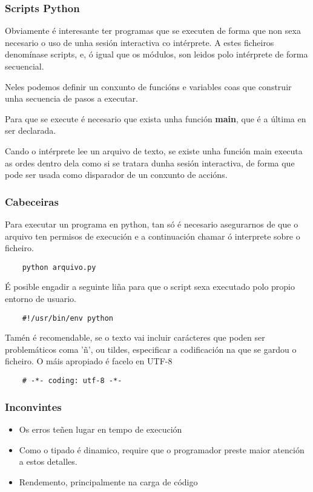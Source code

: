 \begin{frame}
  \frametitle{Scripts Python}
  Obviamente é interesante ter programas que se executen de forma que non sexa
  necesario o uso de unha sesión interactiva co intérprete. A estes ficheiros
  denomínase scripts, e, ó igual que os módulos, son leidos polo intérprete de
  forma secuencial.

  Neles podemos definir un conxunto de funcións e variables coas que construir
  unha secuencia de pasos a executar.

  Para que se execute é necesario que exista unha función \textbf{main}, que é a
  última en ser declarada.

  Cando o intérprete lee un arquivo de texto, se existe unha función main
  executa as ordes dentro dela como si se tratara dunha sesión interactiva, de
  forma que pode ser usada como disparador de un conxunto de accións.
\end{frame}

\begin{frame}[fragile]
  \frametitle{Cabeceiras}
  Para executar un programa en python, tan só é necesario asegurarnos de que o
  arquivo ten permisos de execución e a continuación chamar ó interprete sobre o
  ficheiro.
  \small
  \begin{verbatim}
    python arquivo.py
  \end{verbatim}
  \normalsize
  É posible engadir a seguinte liña para que o script sexa executado polo propio
  entorno de usuario.
  \small
  \begin{verbatim}
    #!/usr/bin/env python 
  \end{verbatim}
  \normalsize
  Tamén é recomendable, se o texto vai incluir carácteres que poden ser
  problemáticos coma 'ñ', ou tildes, especificar a codificación na que se gardou
  o ficheiro. O máis apropiado é facelo en UTF-8
  \begin{verbatim}
    # -*- coding: utf-8 -*-
  \end{verbatim}
  \normalsize
\end{frame}

\begin{frame}
  \frametitle{Inconvintes}
  \begin{itemize}
  \item Os erros teñen lugar en tempo de execución
  \item Como o tipado é dinamico, require que o programador preste maior
    atención a estos detalles.
  \item Rendemento, principalmente na carga de código
  \end{itemize}
\end{frame}